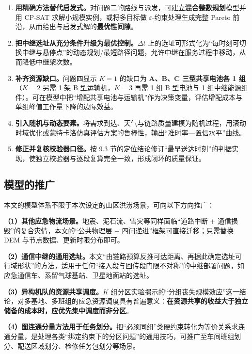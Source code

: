\begin{enumerate}[label=\textbf{改进 \arabic*}]
	\item \textbf{用精确方法替代启发式。}对问题二的路线与派发，可建立\textbf{混合整数规划}模型并用 CP-SAT 求解小规模实例，或将多目标做 $\varepsilon$-约束处理生成完整 Pareto 前沿，从而给出与启发式解的\textbf{最优性间隙}。
	\item \textbf{把中继选址从充分条件升级为最优控制。}$\Delta t$ 上的选址可形式化为“每时刻可切换中继与悬停点”的动态规划/最短路径问题，允许中继在服务过程中移动，从而降低中继架次数。
	\item \textbf{补齐资源缺口。}问题四显示 $K=1$ 的缺口为 \textbf{A、B、C 三型共享电池各 1 组}（$K=2$ 另需 1 架 B 型运输机，$K=3$ 再需 1 组 B 型电池与 1 组中继能源组件）。可在模型中把“增配共享电池与运输机”作为决策变量，评估增配成本与单组峰值工作量下降的边际效益。
	\item \textbf{引入随机与动态要素。}将需求到达、天气与链路质量建模为随机过程，用滚动时域优化或蒙特卡洛仿真评估方案的鲁棒性，输出“准时率—置信水平”曲线。
	\item \textbf{修正并复核校验器口径。}按 9.3 节的定位结论修订“最早送达时刻”的判据实现，使独立校验器与逐段复算完全一致，形成闭环的质量保证。
\end{enumerate}

\subsection{模型的推广}

本文的模型体系不限于本次设定的山区洪涝场景，可向以下方向推广：

\textbf{（1）其他应急物流场景。}地震、泥石流、雪灾等同样面临“道路中断 $+$ 通信损毁”的复合灾情，本文的“公共物理层 $+$ 四问递进”框架可直接迁移；只需替换 DEM 与节点数据、更新时限分布即可。

\textbf{（2）通信中继的通用选址。}本文“由链路预算反推可达距离、再据此确定选址可行域形状”的方法，适用于任何“接入段与回传段门限不对称”的中继部署问题，如应急通信车、系留气球基站、卫星地面站的选址。

\textbf{（3）异构机队的资源共享调度。}$K$ 组分区实验揭示的“分组丧失规模效应”这一结论，对多基地、多班组的应急资源调度具有普遍意义：\textbf{在资源共享的收益大于独立储备的成本时，应优先集中调度而非分区}。

\textbf{（4）图连通分量方法用于任务划分。}把“必须同组”类硬约束转化为等价关系求连通分量，是处理各类“绑定约束下的分区问题”的通用技巧，可推广至车间班组划分、配送区域划分、检修任务包划分等场景。

